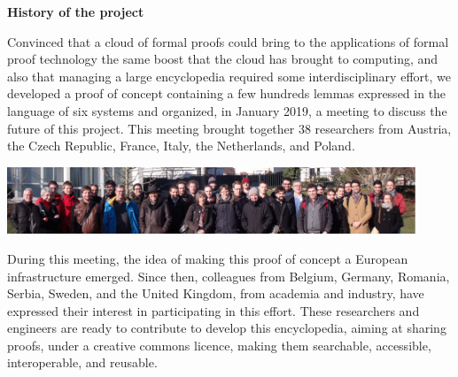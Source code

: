 \begin{center}
\end{center}



\begin{shaded}
  \vspace*{-0.5cm}
  \begin{center}
    {\bf \Large History of the project}
  \end{center}

Convinced that a cloud of formal proofs could bring to the
applications of formal proof technology the same boost that the cloud
has brought to computing, and also that managing a large encyclopedia
required some interdisciplinary effort,
we developed a proof of concept containing a few hundreds lemmas
expressed in the language of six systems and organized, in January 2019,
a meeting to discuss the future of this project.
This
meeting brought together 38 researchers from Austria, the Czech
Republic, France, Italy, the Netherlands, and Poland.
\begin{center}
\includegraphics[height=2cm]{img/Photo-reduced.png}
\end{center}
During this meeting, the idea of making this proof of concept a
European infrastructure emerged.  Since then, colleagues from Belgium,
Germany, Romania, Serbia, Sweden, and the United Kingdom, from
academia and industry, have expressed their interest in participating
in this effort.  These researchers and engineers are ready to
contribute to develop this encyclopedia, aiming at sharing proofs,
under a creative commons licence, making them searchable, accessible,
interoperable, and reusable.
\end{shaded}


